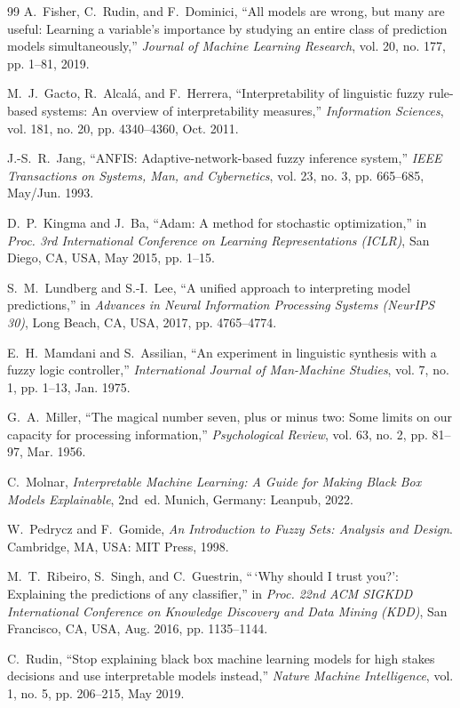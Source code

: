 \documentclass[12pt,a4paper,oneside]{report}
\begin{document}
\begin{thebibliography}{99}
A.~Fisher, C.~Rudin, and F.~Dominici, ``All models are wrong, but many are useful: Learning a variable's importance by studying an entire class of prediction models simultaneously,'' \emph{Journal of Machine Learning Research}, vol. 20, no. 177, pp. 1--81, 2019.

M.~J.~Gacto, R.~Alcal{\'a}, and F.~Herrera, ``Interpretability of linguistic fuzzy rule-based systems: An overview of interpretability measures,'' \emph{Information Sciences}, vol. 181, no. 20, pp. 4340--4360, Oct. 2011.

J.-S.~R.~Jang, ``ANFIS: Adaptive-network-based fuzzy inference system,'' \emph{IEEE Transactions on Systems, Man, and Cybernetics}, vol. 23, no. 3, pp. 665--685, May/Jun. 1993.

D.~P.~Kingma and J.~Ba, ``Adam: A method for stochastic optimization,'' in \emph{Proc. 3rd International Conference on Learning Representations (ICLR)}, San Diego, CA, USA, May 2015, pp. 1--15.

S.~M.~Lundberg and S.-I.~Lee, ``A unified approach to interpreting model predictions,'' in \emph{Advances in Neural Information Processing Systems (NeurIPS 30)}, Long Beach, CA, USA, 2017, pp. 4765--4774.

E.~H.~Mamdani and S.~Assilian, ``An experiment in linguistic synthesis with a fuzzy logic controller,'' \emph{International Journal of Man-Machine Studies}, vol. 7, no. 1, pp. 1--13, Jan. 1975.

G.~A.~Miller, ``The magical number seven, plus or minus two: Some limits on our capacity for processing information,'' \emph{Psychological Review}, vol. 63, no. 2, pp. 81--97, Mar. 1956.

C.~Molnar, \emph{Interpretable Machine Learning: A Guide for Making Black Box Models Explainable}, 2nd~ed. Munich, Germany: Leanpub, 2022.

W.~Pedrycz and F.~Gomide, \emph{An Introduction to Fuzzy Sets: Analysis and Design}. Cambridge, MA, USA: MIT Press, 1998.

M.~T.~Ribeiro, S.~Singh, and C.~Guestrin, ``\,`Why should I trust you?': Explaining the predictions of any classifier,'' in \emph{Proc. 22nd ACM SIGKDD International Conference on Knowledge Discovery and Data Mining (KDD)}, San Francisco, CA, USA, Aug. 2016, pp. 1135--1144.

C.~Rudin, ``Stop explaining black box machine learning models for high stakes decisions and use interpretable models instead,'' \emph{Nature Machine Intelligence}, vol. 1, no. 5, pp. 206--215, May 2019.


\end{thebibliography}
\end{document}
